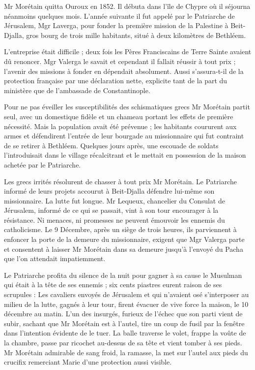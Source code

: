 Mr Morétain quitta Ouroux en 1852. Il débuta dans l'île de Chypre où il séjourna néanmoins quelques mois. L'année suivante il fut appelé par le Patriarche de Jérusalem, Mgr Laverga, pour fonder la première mission de la Palestine à Beit-Djalla, gros bourg de trois mille habitants, situé à deux kilomètres de Bethléem.

L'entreprise était difficile ; deux fois les Pères Franciscains de Terre Sainte avaient dû renoncer. Mgr Valerga le savait et cependant il fallait réussir à tout prix ; l'avenir des missions à fonder en dépendait absolument. Aussi s'assura-t-il de la protection française par une déclaration nette, explicite tant de la part du ministère que de l'ambassade de Constantinople.

Pour ne pas éveiller les susceptibilités des schismatiques grecs Mr Morétain partit seul, avec un domestique fidèle et un chameau portant les effets de première nécessité. Mais la population avait été prévenue ; les habitants coururent aux armes et défendirent l'entrée de leur bourgade au missionnaire qui fut contraint de se retirer à Bethléem. Quelques jours après, une escouade de soldats l'introduisait dans le village récalcitrant et le mettait en possession de la maison achetée par le Patriarche.

Les grecs irrités résolurent de chasser à tout prix Mr Morétain. Le Patriarche informé de leurs projets accourut à Beit-Djalla défendre lui-même son missionnaire. La lutte fut longue. Mr Lequeux, chancelier du Consulat de Jérusalem, informé de ce qui se passait, vint à son tour encourager à la résistance. Ni menaces, ni promesses ne peuvent émouvoir les ennemis du catholicisme. Le 9 Décembre, après un siège de trois heures, ils parviennent à enfoncer la porte de la demeure du missionnaire, exigent que Mgr Valerga parte et consentent à laisser Mr Morétain dans sa demeure jusqu'à l'envoyé du Pacha que l'on attendait impatiemment.

Le Patriarche profita du silence de la nuit pour gagner à sa cause le Musulman qui était à la tête de ses ennemis ; six cents piastres eurent raison de ses scrupules : Les cavaliers envoyés de Jérusalem et qui n'avaient osé s'interposer au milieu de la lutte, gagnés à leur tour, firent évacuer de vive force la maison, le 10 décembre au matin. L'un des insurgés, furieux de l'échec que son parti vient de subir, sachant que Mr Morétain est à l'autel, tire un coup de fusil par la fenêtre dans l'intention évidente de le tuer. La balle traverse le volet, frappe la voûte de la chambre, passe par ricochet au-dessus de sa tête et vient tomber à ses pieds. Mr Morétain admirable
de sang froid, la ramasse, la met sur l'autel aux pieds du crucifix remerciant Marie d'une protection aussi visible.

